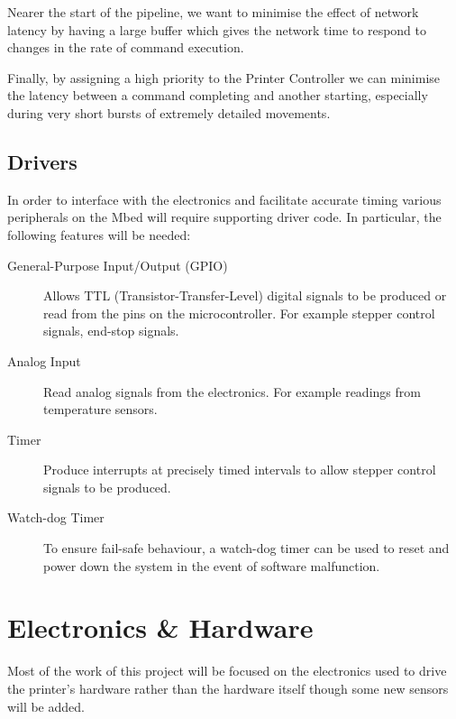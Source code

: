 			Nearer the start of the pipeline, we want to minimise the effect of
			network latency by having a large buffer which gives the network time to
			respond to changes in the rate of command execution.
			
			
			Finally, by assigning a high priority to the Printer Controller we can
			minimise the latency between a command completing and another starting,
			especially during very short bursts of extremely detailed movements.
		
		\subsection{Drivers}
			
			In order to interface with the electronics and facilitate accurate timing
			various peripherals on the Mbed will require supporting driver code. In
			particular, the following features will be needed:
			
			\begin{description}
				\item[General-Purpose Input/Output (GPIO)]
					Allows TTL (Transistor-Transfer-Level) digital signals to be produced
					or read from the pins on the microcontroller. For example stepper
					control signals, end-stop signals.
				
				\item[Analog Input]
					Read analog signals from the electronics. For example readings from
					temperature sensors.
				
				\item[Timer]
					Produce interrupts at precisely timed intervals to allow stepper
					control signals to be produced.
				
				\item[Watch-dog Timer]
					To ensure fail-safe behaviour, a watch-dog timer can be used to reset
					and power down the system in the event of software malfunction.
			\end{description}
	
	
	\section{Electronics \& Hardware}
		
		Most of the work of this project will be focused on the electronics used to
		drive the printer's hardware rather than the hardware itself though some
		new sensors will be added.
		
